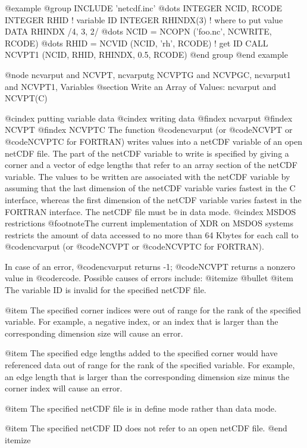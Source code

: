 @example
@group
      INCLUDE 'netcdf.inc'
         @dots{}
      INTEGER  NCID, RCODE
      INTEGER  RHID               ! variable ID
      INTEGER  RHINDX(3)          ! where to put value
      DATA RHINDX /4, 3, 2/
         @dots{}
      NCID = NCOPN ('foo.nc', NCWRITE, RCODE)
         @dots{}
      RHID = NCVID (NCID, 'rh', RCODE)  ! get ID
      CALL NCVPT1 (NCID, RHID, RHINDX, 0.5, RCODE)
@end group
@end example

@node ncvarput and NCVPT, ncvarputg NCVPTG and NCVPGC, ncvarput1 and NCVPT1, Variables
@section Write an Array of Values:  ncvarput and NCVPT(C)

@cindex putting variable data
@cindex writing data
@findex ncvarput
@findex NCVPT
@findex NCVPTC
The function @code{ncvarput} (or @code{NCVPT} or @code{NCVPTC} for
FORTRAN) writes values into a netCDF variable of an open netCDF file.
The part of the netCDF variable to write is specified by giving a corner
and a vector of edge lengths that refer to an array section of the
netCDF variable.  The values to be written are associated with the
netCDF variable by assuming that the last dimension of the netCDF
variable varies fastest in the C interface, whereas the first dimension
of the netCDF variable varies fastest in the FORTRAN interface.  The
netCDF file must be in data mode.
@cindex MSDOS restrictions
@footnote{The current implementation of XDR on MSDOS systems restricts
the amount of data accessed to no more than 64 Kbytes for each call
to @code{ncvarput} (or @code{NCVPT} or @code{NCVPTC} for FORTRAN).}

In case of an error, @code{ncvarput} returns -1; @code{NCVPT} returns a
nonzero value in @code{rcode}.  Possible causes of errors include:
@itemize @bullet
@item
The variable ID is invalid for the specified netCDF file.

@item
The specified corner indices were out of range for the rank of
the specified variable.  For example, a negative index, or an index that
is larger than the corresponding dimension size will cause an error.

@item
The specified edge lengths added to the specified corner would have
referenced data out of range for the rank of the specified
variable.  For example, an edge length that is larger than the
corresponding dimension size minus the corner index will cause an error.

@item
The specified netCDF file is in define mode rather than data mode.

@item
The specified netCDF ID does not refer to an open netCDF file.
@end itemize

